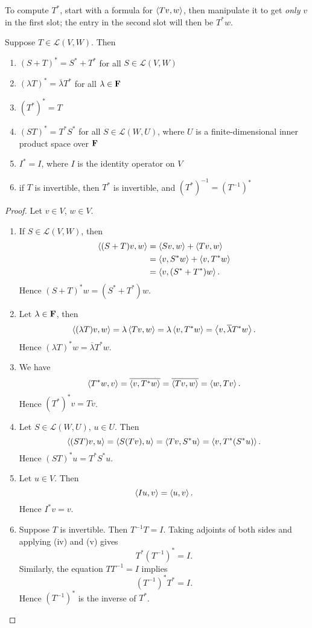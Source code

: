 \begin{remark}
To compute $T^*$, start with a formula for $\left\langle Tv,w\right\rangle$, then manipulate it to get \emph{only} $v$ in the first slot; the entry in the second slot will then be $T^*w$.
\end{remark}

\begin{lemma}
Suppose $T\in\mathcal{L}(V,W)$. Then
\begin{enumerate}[label=(\roman*)]
\item $(S+T)^*=S^*+T^*$ for all $S\in\mathcal{L}(V,W)$
\item $(\lambda T)^*=\overline{\lambda}T^*$ for all $\lambda\in\mathbf F$
\item $(T^*)^*=T$
\item $(ST)^*=T^*S^*$ for all $S\in\mathcal{L}(W,U)$, where $U$ is a finite-dimensional inner product space over $\mathbf F$
\item $I^*=I$, where $I$ is the identity operator on $V$
\item if $T$ is invertible, then $T^*$ is invertible, and $(T^*)^{-1}=(T^{-1})^*$
\end{enumerate}
\end{lemma}

\begin{proof}
Let $v\in V$, $w\in V$.
\begin{enumerate}[label=(\roman*)]
\item If $S\in\mathcal{L}(V,W)$, then
\begin{align*}
\left\langle(S+T)v,w\right\rangle
&=\left\langle Sv,w\right\rangle+\left\langle Tv,w\right\rangle\\
&=\left\langle v,S^*w\right\rangle+\left\langle v,T^*w\right\rangle\\
&=\left\langle v,(S^*+T^*)w\right\rangle.
\end{align*}
Hence $(S+T)^*w=(S^*+T^*)w$.

\item Let $\lambda\in\mathbf F$, then
\[\left\langle(\lambda T)v,w\right\rangle
=\lambda\left\langle Tv,w\right\rangle
=\lambda\left\langle v,T^*w\right\rangle
=\left\langle v,\overline{\lambda}T^*w\right\rangle.\]
Hence $(\lambda T)^*w=\overline{\lambda}T^*w$.

\item We have
\[\left\langle T^*w,v\right\rangle
=\overline{\left\langle v,T^*w\right\rangle}
=\overline{\left\langle Tv,w\right\rangle}
=\left\langle w,Tv\right\rangle.\]
Hence $(T^*)^*v=Tv$.

\item Let $S\in\mathcal{L}(W,U)$, $u\in U$. Then
\[\left\langle(ST)v,u\right\rangle
=\left\langle S(Tv),u\right\rangle
=\left\langle Tv,S^*u\right\rangle
=\left\langle v,T^*(S^*u)\right\rangle.\]
Hence $(ST)^*u=T^*S^*u$.

\item Let $u\in V$. Then
\[\left\langle Iu,v\right\rangle=\left\langle u,v\right\rangle.\]
Hence $I^*v=v$.

\item Suppose $T$ is invertible. Then $T^{-1}T=I$. Taking adjoints of both sides and applying (iv) and (v) gives
\[T^*(T^{-1})^*=I.\]
Similarly, the equation $TT^{-1}=I$ implies
\[(T^{-1})^*T^*=I.\]
Hence $(T^{-1})^*$ is the inverse of $T^*$.
\end{enumerate}
\end{proof}

